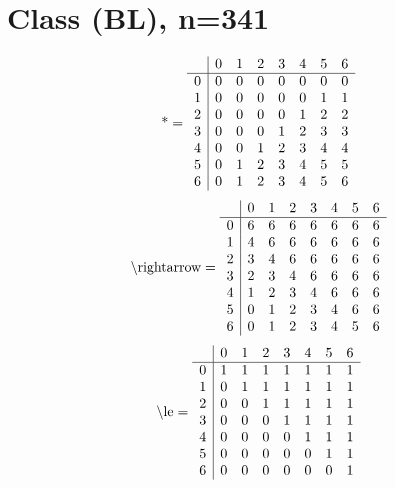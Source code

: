 \documentclass[11pt]{article}
\begin{document}
\section{Class (BL), n=341}
\[\text{*} = 
\begin{array}{r | r r r r r r r}
 & 0 & 1 & 2 & 3 & 4 & 5 & 6 \\ \hline
0 & 0 & 0 & 0 & 0 & 0 & 0 & 0 \\
1 & 0 & 0 & 0 & 0 & 0 & 1 & 1 \\
2 & 0 & 0 & 0 & 0 & 1 & 2 & 2 \\
3 & 0 & 0 & 0 & 1 & 2 & 3 & 3 \\
4 & 0 & 0 & 1 & 2 & 3 & 4 & 4 \\
5 & 0 & 1 & 2 & 3 & 4 & 5 & 5 \\
6 & 0 & 1 & 2 & 3 & 4 & 5 & 6 \\
\end{array}
\]
\[\text{\textbackslash rightarrow} = 
\begin{array}{r | r r r r r r r}
 & 0 & 1 & 2 & 3 & 4 & 5 & 6 \\ \hline
0 & 6 & 6 & 6 & 6 & 6 & 6 & 6 \\
1 & 4 & 6 & 6 & 6 & 6 & 6 & 6 \\
2 & 3 & 4 & 6 & 6 & 6 & 6 & 6 \\
3 & 2 & 3 & 4 & 6 & 6 & 6 & 6 \\
4 & 1 & 2 & 3 & 4 & 6 & 6 & 6 \\
5 & 0 & 1 & 2 & 3 & 4 & 6 & 6 \\
6 & 0 & 1 & 2 & 3 & 4 & 5 & 6 \\
\end{array}
\]
\[\text{\textbackslash le} = 
\begin{array}{r | r r r r r r r}
 & 0 & 1 & 2 & 3 & 4 & 5 & 6 \\ \hline
0 & 1 & 1 & 1 & 1 & 1 & 1 & 1 \\
1 & 0 & 1 & 1 & 1 & 1 & 1 & 1 \\
2 & 0 & 0 & 1 & 1 & 1 & 1 & 1 \\
3 & 0 & 0 & 0 & 1 & 1 & 1 & 1 \\
4 & 0 & 0 & 0 & 0 & 1 & 1 & 1 \\
5 & 0 & 0 & 0 & 0 & 0 & 1 & 1 \\
6 & 0 & 0 & 0 & 0 & 0 & 0 & 1 \\
\end{array}
\]
\end{document}
